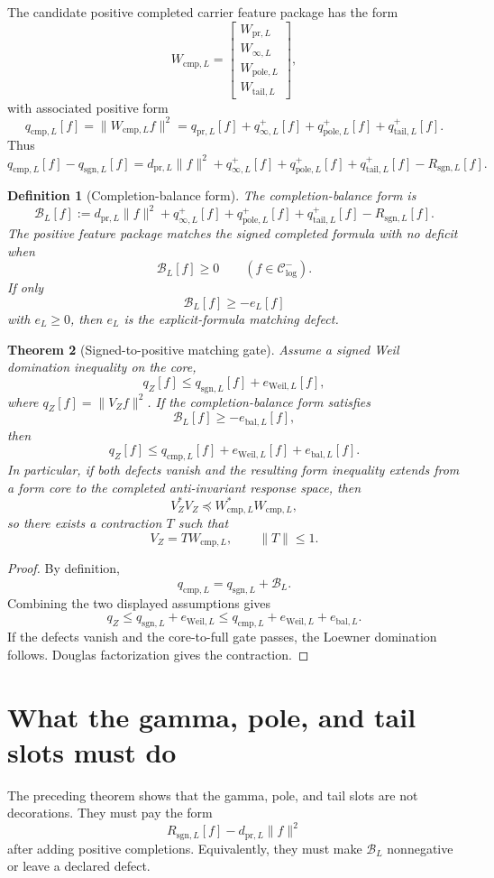 \documentclass[11pt]{article}
\newtheorem{theorem}{Theorem}[section]
\newtheorem{definition}[theorem]{Definition}
\newcommand{\pr}{\mathrm{pr}}
\newcommand{\cmp}{\mathrm{cmp}}
\newcommand{\sgn}{\mathrm{sgn}}
\newcommand{\tail}{\mathrm{tail}}
\newcommand{\pole}{\mathrm{pole}}
\newcommand{\bal}{\mathrm{bal}}
\begin{document}
The candidate positive completed carrier feature package has the form
\[
    W_{\cmp,L}=\begin{bmatrix}W_{\pr,L}\\ W_{\infty,L}\\ W_{\pole,L}\\ W_{\tail,L}\end{bmatrix},
\]
with associated positive form
\[
    q_{\cmp,L}[f]=\|W_{\cmp,L}f\|^2
    =q_{\pr,L}[f]+q_{\infty,L}^+[f]+q_{\pole,L}^+[f]+q_{\tail,L}^+[f].
\]
Thus
\[
    q_{\cmp,L}[f]-q_{\sgn,L}[f]
    =d_{\pr,L}\|f\|^2
     +q_{\infty,L}^+[f]+q_{\pole,L}^+[f]+q_{\tail,L}^+[f]
     -R_{\sgn,L}[f].
\]

\begin{definition}[Completion-balance form]
The completion-balance form is
\[
    \mathcal B_L[f]
    :=d_{\pr,L}\|f\|^2
     +q_{\infty,L}^+[f]+q_{\pole,L}^+[f]+q_{\tail,L}^+[f]
     -R_{\sgn,L}[f].
\]
The positive feature package matches the signed completed formula with no deficit when
\[
    \mathcal B_L[f]\ge0\qquad (f\in\mathcal C^-_{\log}).
\]
If only
\[
    \mathcal B_L[f]\ge -e_L[f]
\]
with \(e_L\ge0\), then \(e_L\) is the explicit-formula matching defect.
\end{definition}

\begin{theorem}[Signed-to-positive matching gate]
Assume a signed Weil domination inequality on the core,
\[
    q_Z[f]\le q_{\sgn,L}[f]+e_{\mathrm{Weil},L}[f],
\]
where \(q_Z[f]=\|V_Zf\|^2\).  If the completion-balance form satisfies
\[
    \mathcal B_L[f]\ge -e_{\bal,L}[f],
\]
then
\[
    q_Z[f]\le q_{\cmp,L}[f]+e_{\mathrm{Weil},L}[f]+e_{\bal,L}[f].
\]
In particular, if both defects vanish and the resulting form inequality extends from a form core to the completed anti-invariant response space, then
\[
    V_Z^*V_Z\preceq W_{\cmp,L}^*W_{\cmp,L},
\]
so there exists a contraction \(T\) such that
\[
    V_Z=T W_{\cmp,L},\qquad \|T\|\le1.
\]
\end{theorem}

\begin{proof}
By definition,
\[
q_{\cmp,L}=q_{\sgn,L}+\mathcal B_L.
\]
Combining the two displayed assumptions gives
\[
q_Z\le q_{\sgn,L}+e_{\mathrm{Weil},L}
\le q_{\cmp,L}+e_{\mathrm{Weil},L}+e_{\bal,L}.
\]
If the defects vanish and the core-to-full gate passes, the Loewner domination follows.  Douglas factorization gives the contraction.
\end{proof}

\section{What the gamma, pole, and tail slots must do}
The preceding theorem shows that the gamma, pole, and tail slots are not decorations.  They must pay the form
\[
    R_{\sgn,L}[f]-d_{\pr,L}\|f\|^2
\]
after adding positive completions.  Equivalently, they must make \(\mathcal B_L\) nonnegative or leave a declared defect.
\end{document}
